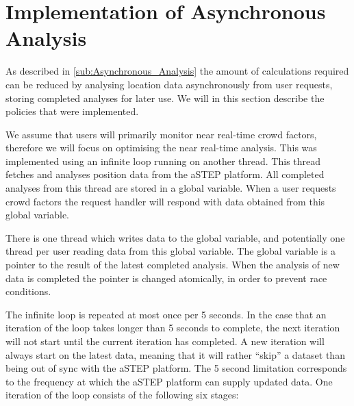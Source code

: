 \section{Implementation of Asynchronous Analysis}
\label{sub:implementation_of_asynchronous_analysis}
As described in \cref{sub:Asynchronous_Analysis} the amount of calculations required can be reduced by analysing location data asynchronously from user requests, storing completed analyses for later use. We will in this section describe the policies that were implemented. 

We assume that users will primarily monitor near real-time crowd factors, therefore we will focus on optimising the near real-time analysis. This was implemented using an infinite loop running on another thread. This thread fetches and analyses position data from the aSTEP platform. All completed analyses from this thread are stored in a global variable. When a user requests crowd factors the request handler will respond with data obtained from this global variable.

There is one thread which writes data to the global variable, and potentially one thread per user reading data from this global variable. The global variable is a pointer to the result of the latest completed analysis. When the analysis of new data is completed the pointer is changed atomically, in order to prevent race conditions.

The infinite loop is repeated at most once per 5 seconds. In the case that an iteration of the loop takes longer than 5 seconds to complete, the next iteration will not start until the current iteration has completed. A new iteration will always start on the latest data, meaning that it will rather \enquote{skip} a dataset than being out of sync with the aSTEP platform. The 5 second limitation corresponds to the frequency at which the aSTEP platform can supply updated data. One iteration of the loop consists of the following six stages: 

